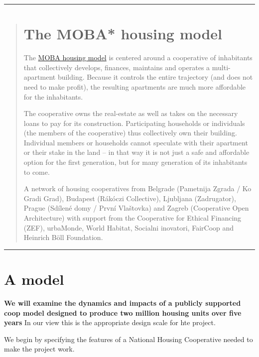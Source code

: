  \hrule
\vspace{1cm}
\begin{quotation}
\section*{The MOBA* housing model}

The \href{https://moba.coop/}{MOBA housing model}  is centered around a cooperative of inhabitants that collectively develops, finances, maintains and operates a multi-apartment building. Because it controls the entire trajectory (and does not need to make profit), the resulting apartments are much more affordable for the inhabitants. 


The cooperative owns the real-estate as well as takes on the necessary loans to pay for its construction. Participating households or individuals (the members of the cooperative) thus collectively own their building. Individual members or households cannot speculate with their apartment or their stake in the land – in that way it is not just a safe and affordable option for the first generation, but for many generation of its inhabitants to come.  


\tiny * A network of housing cooperatives from Belgrade (Pametnija Zgrada / Ko Gradi Grad), Budapest (R\'ak\'oczi Collective),  Ljubljana (Zadrugator), Prague (Sd\'ilen\'e domy / První Vlaštovka) and Zagreb (Cooperative Open Architecture)  with support from the Cooperative for Ethical Financing (ZEF), urbaMonde, World Habitat, Socialni inovatori, FairCoop and Heinrich B\"oll Foundation.\normalsize

 \end{quotation}
 \vspace{1cm}
 \hrule
 \color{black}

\newpage
\section{A model}
 \textbf{We will examine the dynamics and impacts of a publicly supported coop model designed to produce two million housing units over five years} In our view this is the appropriate design scale for hte project. 

 We begin by specifying the features of a National Housing Cooperative needed to make the project work.

